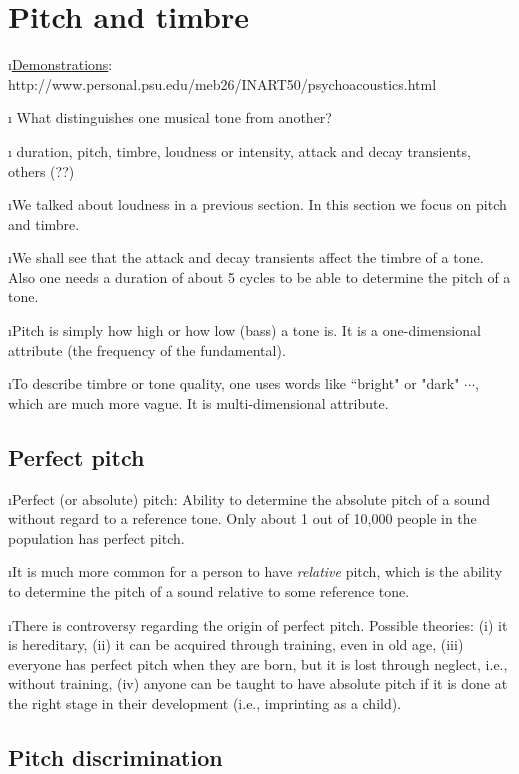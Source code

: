 \section{Pitch and timbre}
\bi

\i \underline{Demonstrations}:
http://www.personal.psu.edu/meb26/INART50/psychoacoustics.html

\i \ques 
What distinguishes one musical tone from another?

\i \ans
duration, pitch, timbre, loudness or intensity, attack and 
decay transients, others (??)

\i We talked about loudness in a previous section.  
In this section we focus on pitch and timbre.

\i We shall see that the attack and decay transients 
affect the timbre of a tone.
Also one needs a duration of about 5 cycles to be able to 
determine the pitch of a tone.

\i Pitch is simply how high or how low (bass) a tone is.
It is a one-dimensional attribute (the frequency of the 
fundamental).

\i To describe timbre or tone quality, one uses words 
like ``bright" or "dark" $\cdots$, which are much more vague.
It is multi-dimensional attribute.

\ei

\subsection{Perfect pitch}
\bi

\i Perfect (or absolute) pitch:
Ability to determine the absolute pitch 
of a sound without regard to a reference tone.
Only about 1 out of 10,000 people in the population has perfect pitch. 

\i It is much more common for a person
to have {\em relative} pitch, which is the 
ability to determine the pitch of a sound
relative to some reference tone.

\i There is controversy regarding the origin
of perfect pitch.
Possible theories:
(i) it is hereditary,
(ii) it can be acquired through training, 
even in old age,
(iii) everyone has perfect pitch when they are
born, but it is lost through neglect, i.e., 
without training,
(iv) anyone can be taught to have absolute 
pitch if it is done at the right stage in 
their development (i.e., imprinting as a child).

\ei
\subsection{Pitch discrimination}
\bi

